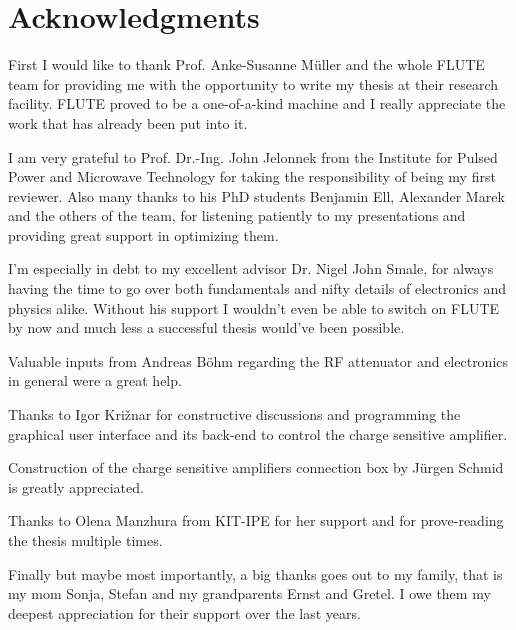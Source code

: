 \chapter*{Acknowledgments}

First I would like to thank Prof. Anke-Susanne Müller and the whole FLUTE team for providing me with the opportunity to write my thesis at their research facility. FLUTE proved to be a one-of-a-kind machine and I really appreciate the work that has already been put into it.

I am very grateful to Prof. Dr.-Ing. John Jelonnek from the Institute for Pulsed Power and Microwave Technology for taking the responsibility of being my first reviewer. Also many thanks to his PhD students Benjamin Ell, Alexander Marek and the others of the team, for listening patiently to my presentations and providing great support in optimizing them. 

I'm especially in debt to my excellent advisor Dr. Nigel John Smale, for always having the time to go over both fundamentals and nifty details of electronics and physics alike. Without his support I wouldn't even be able to switch on FLUTE by now and much less a successful thesis would've been possible.

Valuable inputs from Andreas Böhm regarding the RF attenuator and electronics in general were a great help.

Thanks to Igor Križnar for constructive discussions and programming the graphical user interface and its back-end to control the charge sensitive amplifier.

Construction of the charge sensitive amplifiers connection box by Jürgen Schmid is greatly appreciated.

Thanks to Olena Manzhura from KIT-IPE for her support and for prove-reading the thesis multiple times.

Finally but maybe most importantly, a big thanks goes out to my family, that is my mom Sonja, Stefan and my grandparents Ernst and Gretel. I owe them my deepest appreciation for their support over the last years.
